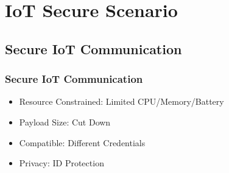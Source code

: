 \documentclass{ctexbeamer}
\begin{document}
\section{IoT Secure Scenario}

\subsection{Secure IoT Communication}
\begin{frame}
    \frametitle{Secure IoT Communication}
           \begin{itemize}
               \item Resource Constrained: Limited CPU/Memory/Battery
               \item Payload Size: Cut Down
               \item Compatible: Different Credentials
               \item Privacy: ID Protection
           \end{itemize}
\end{frame}
\end{document}
